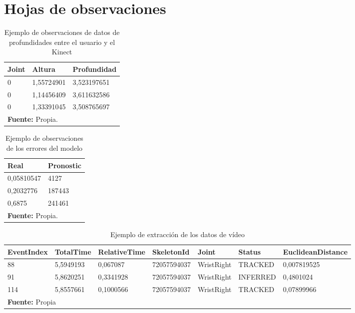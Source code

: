 \section{Hojas de observaciones}
\begin{table}[H]
\begin{center}
\caption{Ejemplo de observaciones de datos de profundidades entre el usuario y el Kinect}
\label{tab:obsDepth}
\begin{tabular}{|l|l|l|}
\hline
Joint & Altura & Profundidad \\ \hline
0 & 1,55724901 & 3,523197651 \\ \hline
0 & 1,14456409 & 3,611632586 \\ \hline
0 & 1,33391045 & 3,508765697 \\ \hline
\multicolumn{3}{l}{\textbf{Fuente:} Propia.}
\end{tabular}
\end{center}
\end{table}

\begin{table}[H]
\begin{center}
\caption{Ejemplo de observaciones de los errores del modelo}
\label{tab:obsErrores}
\begin{tabular}{|l|l|}
\hline
Real & Pronostic \\ \hline
0,05810547 & 4127 \\ \hline
0,2032776 & 187443 \\ \hline
0,6875 & 241461 \\ \hline
\multicolumn{2}{l}{\textbf{Fuente:} Propia.}
\end{tabular}
\end{center}
\end{table}

\begin{table}[H]
\begin{center}
\caption{Ejemplo de extracci\'on de los datos de v\'ideo}
\label{tab:obsVideoData}
\begin{tabular}{|l|l|l|l|l|l|l|}
\hline
EventIndex & TotalTime & RelativeTime  & SkeletonId & Joint & Status & EuclideanDistance \\ \hline
88 & 5,5949193 & 0,067087 & 72057594037 & WristRight & TRACKED & 0,007819525\\ \hline
91 & 5,8620251 & 0,3341928 & 72057594037 & WristRight & INFERRED & 0,4801024\\ \hline
114 & 5,8557661 & 0,1000566 & 72057594037 & WristRight & TRACKED & 0,07899966\\ \hline
\multicolumn{7}{l}{\textbf{Fuente:} Propia}
\end{tabular}
\end{center}
\end{table}


